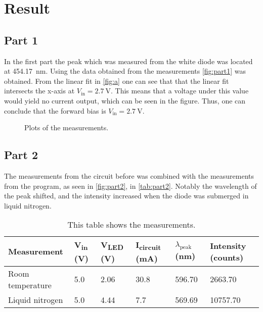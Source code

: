 \section{Result}
\subsection{Part 1}
In the first part the peak which was measured from the white diode was located at \SI{454.17}{\nano\m}. Using the data obtained from the measurements \autoref{fig:part1} was obtained. From the linear fit in \autoref{fig:a} one can see that that the linear fit intersects the x-axis at $V_\text{in}=\SI{2.7}{\V}$. This means that a voltage under this value would yield no current output, which can be seen in the figure. Thus, one can conclude that the forward bias is $V_\text{in}=\SI{2.7}{\V}$. 

\begin{figure}[H]
    \centering
    \hfill
    
    \vspace{0.5cm}
    

    \caption{Plots of the measurements.}
    \label{fig:part1}
\end{figure}




\subsection{Part 2}
The measurements from the circuit before was combined with the measurements from the program, as seen in \autoref{fig:part2}, in \autoref{tab:part2}. Notably the wavelength of the peak shifted, and the intensity increased when the diode was submerged in liquid nitrogen.

\begin{table}[H]
    \centering
    \caption{This table shows the measurements.}
    \begin{tabular}{@{}llllll@{}}
    \toprule
    Measurement      & V\textsubscript{in} (V) & V\textsubscript{LED} (V) & I\textsubscript{circuit} (mA) & $\lambda_\text{peak}$ (nm) & Intensity (counts) \\ \midrule
    Room temperature & 5.0& 2.06& 30.8& 596.70& 2663.70\\
    Liquid nitrogen  & 5.0& 4.44                     & 7.7& 569.69& 10757.70\\ \bottomrule
    \end{tabular}
    \label{tab:part2}
    \end{table}


